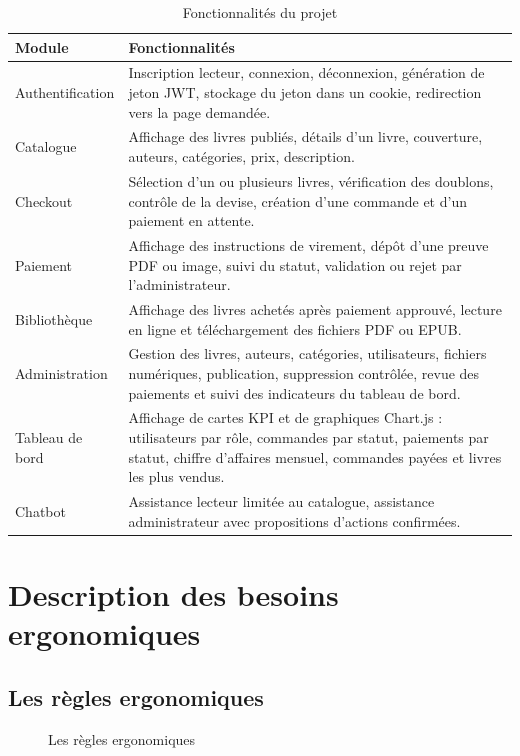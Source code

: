 \documentclass[12pt,a4paper]{report}
\begin{document}
\begin{longtable}{|p{4cm}|p{9.6cm}|}
    \caption{Fonctionnalités du projet}\\
    \hline
    \textbf{Module} & \textbf{Fonctionnalités}\\
    \hline
    Authentification & Inscription lecteur, connexion, déconnexion, génération de jeton JWT, stockage du jeton dans un cookie, redirection vers la page demandée.\\
    \hline
    Catalogue & Affichage des livres publiés, détails d'un livre, couverture, auteurs, catégories, prix, description.\\
    \hline
    Checkout & Sélection d'un ou plusieurs livres, vérification des doublons, contrôle de la devise, création d'une commande et d'un paiement en attente.\\
    \hline
    Paiement & Affichage des instructions de virement, dépôt d'une preuve PDF ou image, suivi du statut, validation ou rejet par l'administrateur.\\
    \hline
    Bibliothèque & Affichage des livres achetés après paiement approuvé, lecture en ligne et téléchargement des fichiers PDF ou EPUB.\\
    \hline
    Administration & Gestion des livres, auteurs, catégories, utilisateurs, fichiers numériques, publication, suppression contrôlée, revue des paiements et suivi des indicateurs du tableau de bord.\\
    \hline
    Tableau de bord & Affichage de cartes KPI et de graphiques Chart.js : utilisateurs par rôle, commandes par statut, paiements par statut, chiffre d'affaires mensuel, commandes payées et livres les plus vendus.\\
    \hline
    Chatbot & Assistance lecteur limitée au catalogue, assistance administrateur avec propositions d'actions confirmées.\\
    \hline
\end{longtable}

\section{Description des besoins ergonomiques}

\subsection{Les règles ergonomiques}

\begin{figure}[htbp]
    \centering
    \caption{Les règles ergonomiques}
\end{figure}
\end{document}
